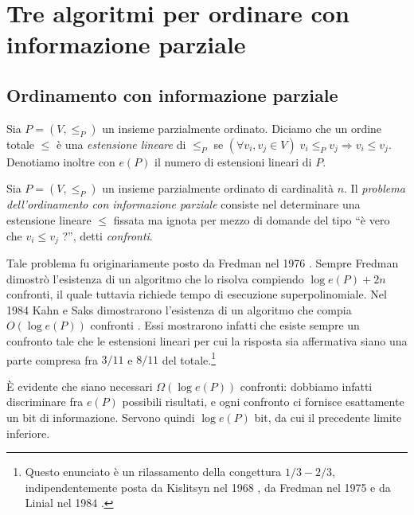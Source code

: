 \chapter{Tre algoritmi per ordinare con informazione parziale}

\section{Ordinamento con informazione parziale} 
\begin{definition}
	Sia \(P=\left(V,\le_{P}\right)\) un insieme parzialmente ordinato. Diciamo che un ordine totale \(\le\) \`e una \emph{estensione lineare} di \(\le_{P}\) se \((\forall v_i, v_j\in V)\;v_i\le_{P} v_j\Rightarrow v_i\le v_j\). Denotiamo inoltre con \(e(P)\) il numero di estensioni lineari di \(P\). 
\end{definition}
\begin{definition}
	Sia \(P=(V,\le_{P})\) un insieme parzialmente ordinato di cardinalit\`a \(n\). Il \emph{problema dell'ordinamento con informazione parziale} consiste nel determinare una estensione lineare \(\le\) fissata ma ignota per mezzo di domande del tipo ``\`e vero che \(v_i\le v_j\) ?'', detti \emph{confronti}. 
\end{definition}

Tale problema fu originariamente posto da Fredman nel 1976 \cite{Fredman1976}. Sempre Fredman dimostrò l'esistenza di un algoritmo che lo risolva compiendo \(\log{e(P)} + 2n\) confronti, il quale tuttavia richiede tempo di esecuzione superpolinomiale. Nel 1984 Kahn e Saks dimostrarono l'esistenza di un algoritmo che compia \(O(\log{e(P)})\) confronti \cite{Kahn1984}. Essi mostrarono infatti che esiste sempre un confronto tale che le estensioni lineari per cui la risposta sia affermativa siano una parte compresa fra \(3/11\) e \(8/11\) del totale.\footnote{Questo enunciato è un rilassamento della congettura \(1/3-2/3\), indipendentemente posta da Kislitsyn nel 1968 \cite{Kislitsyn1968}, da Fredman nel 1975 e da Linial nel 1984 \cite{Linial1984}.}

È evidente che siano necessari \(\Omega(\log{e(P)})\) confronti: dobbiamo infatti discriminare fra \(e(P)\) possibili risultati, e ogni confronto ci fornisce esattamente un bit di informazione. Servono quindi \(\log{e(P)}\) bit, da cui il precedente limite inferiore.

